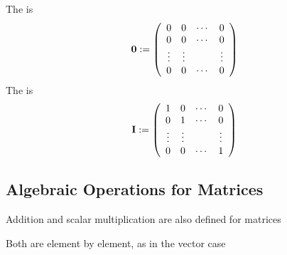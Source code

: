 \documentclass[letterpaper,10pt,english]{jupyterBook}
\begin{document}
\sphinxAtStartPar
The  is
\begin{equation*}
\begin{split}
%
{\bf 0} := 
\left(
\begin{array}{cccc}
0 & 0 & \cdots & 0 \\
0 & 0 & \cdots & 0 \\
\vdots & \vdots & & \vdots \\
0 & 0 & \cdots & 0 \\
\end{array}
\right)
%
\end{split}
\end{equation*}
\sphinxAtStartPar
The  is
\begin{equation*}
\begin{split}
%
{\bf I} := 
\left(
\begin{array}{cccc}
1 & 0 & \cdots & 0 \\
0 & 1 & \cdots & 0 \\
\vdots & \vdots & & \vdots \\
0 & 0 & \cdots & 1 \\
\end{array}
\right)
%
\end{split}
\end{equation*}

\subsection{Algebraic Operations for Matrices}
\label{\detokenize{05.linear_algebra:algebraic-operations-for-matrices}}
\sphinxAtStartPar
Addition and scalar multiplication are also defined for matrices

\sphinxAtStartPar
Both are element by element, as in the vector case
\end{document}
